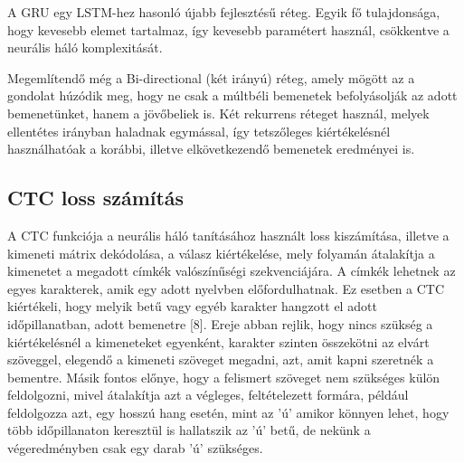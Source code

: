 A GRU egy LSTM-hez hasonló újabb fejlesztésű réteg. Egyik fő tulajdonsága, hogy kevesebb elemet tartalmaz, így kevesebb paramétert használ, csökkentve a neurális háló komplexitását.

Megemlítendő még a Bi-directional (két irányú) réteg, amely mögött az a gondolat húzódik meg, hogy ne csak a múltbéli bemenetek befolyásolják az adott bemenetünket, hanem a jövőbeliek is. Két rekurrens réteget használ, melyek ellentétes irányban haladnak egymással, így tetszőleges kiértékelésnél használhatóak a korábbi, illetve elkövetkezendő bemenetek eredményei is.

\subsection{CTC loss számítás}

A CTC funkciója a neurális háló tanításához használt loss kiszámítása, illetve a kimeneti mátrix dekódolása, a válasz kiértékelése, mely folyamán átalakítja a kimenetet a megadott címkék valószínűségi szekvenciájára. A címkék lehetnek az egyes karakterek, amik egy adott nyelvben előfordulhatnak. Ez esetben a CTC kiértékeli, hogy melyik betű vagy egyéb karakter hangzott el adott időpillanatban, adott bemenetre [8]. Ereje abban rejlik, hogy nincs szükség a kiértékelésnél a kimeneteket egyenként, karakter szinten összekötni az elvárt szöveggel, elegendő a kimeneti szöveget megadni, azt, amit kapni szeretnék a bementre. Másik fontos előnye, hogy a felismert szöveget nem szükséges külön feldolgozni, mivel átalakítja azt a végleges, feltételezett formára, például feldolgozza azt, egy hosszú hang esetén, mint az ’ú’ amikor könnyen lehet, hogy több időpillanaton keresztül is hallatszik az ’ú’ betű, de nekünk a végeredményben csak egy darab ’ú’ szükséges.


